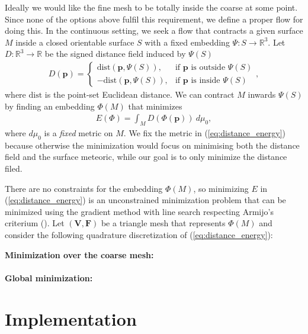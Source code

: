 Ideally we would like the fine mesh to be totally inside the coarse at some
point. Since none of the options above fulfil this requirement, we define a
proper flow for doing this. In the continuous setting, we seek a flow that
contracts a given surface $M$ inside a closed orientable surface $S$ with a
fixed embedding $\Psi: S \to \mathbb{R}^3$. Let $D: \mathbb{R}^3 \to
\mathbb{R}$ be the signed distance field induced by $\Psi(S)$
\begin{align}
D(\mathbf{p}) = \left\{ \begin{array}{rl} 
\mathrm{dist}(\mathbf{p},\Psi(S)), & \mbox{if } \mathbf{p} \mbox{ is outside } \Psi(S) 
\\
-\mathrm{dist}(\mathbf{p},\Psi(S)), & \mbox{if } \mathbf{p} \mbox{ is inside } \Psi(S)
\end{array}
\right. ,
\end{align}
where $\mathrm{dist}$ is the point-set Euclidean distance. We can contract $M$
inwards $\Psi(S)$ by finding an embedding $\Phi(M)$ that minimizes
\begin{align}
E(\Phi) = \int_M D(\Phi(\mathbf{p}))\ d \mu_0,
\label{eq:distance_energy}
\end{align} 
where $d \mu_0$ is a \emph{fixed} metric on $M$. We fix the metric in
(\ref{eq:distance_energy}) because otherwise the minimization would focus on
minimising both the distance field and the surface meteoric, while our goal is
to only minimize the distance filed. 

There are no constraints for the embedding $\Phi(M)$, so minimizing $E$ in
(\ref{eq:distance_energy}) is an unconstrained minimization problem that can be
minimized using the gradient method with line search respecting Armijo's
criterium (). Let $(\mathbf{V}, \mathbf{F})$ be a
triangle mesh that represents $\Phi(M)$ and consider the following quadrature
discretization of  (\ref{eq:distance_energy}):

\textbf{Minimization over the coarse mesh:}
\\
\\
\textbf{Global minimization:}

\section{Implementation}
\label{sec:implementation}



